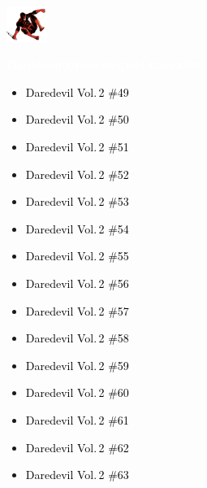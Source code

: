 \documentclass[12pt]{article}
\newcommand{\checkbox}{\raisebox{0.0ex}{\fbox{\rule{0ex}{1.5ex} \rule{1.5ex}{0ex}}}}
\begin{document}
\begin{center}
    \vspace*{2cm}
    \includegraphics[width=0.1\textwidth]{daredevil1.png}
    \vspace{0.3cm}

    {\Huge \textbf{\textcolor{white}{Daredevil Chronological Checklist}}}
\end{center}

\vspace{0.3cm}
\noindent
\begin{tcolorbox}[
  colback=white!95!gray,
  colframe=black,
  width=\textwidth,
  arc=4mm,
  auto outer arc,
  boxrule=0.8pt,
  left=8pt,right=8pt,top=8pt,bottom=8pt
]
\begin{itemize}[left=0pt,label={\checkbox}]
    \item \textcolor{black}{Daredevil Vol.\,2 \#49}
    \item \textcolor{black}{Daredevil Vol.\,2 \#50}
    \item \textcolor{black}{Daredevil Vol.\,2 \#51}
    \item \textcolor{black}{Daredevil Vol.\,2 \#52}
    \item \textcolor{black}{Daredevil Vol.\,2 \#53}
    \item \textcolor{black}{Daredevil Vol.\,2 \#54}
    \item \textcolor{black}{Daredevil Vol.\,2 \#55}
    \item \textcolor{black}{Daredevil Vol.\,2 \#56}
    \item \textcolor{black}{Daredevil Vol.\,2 \#57}
    \item \textcolor{black}{Daredevil Vol.\,2 \#58}
    \item \textcolor{black}{Daredevil Vol.\,2 \#59}
    \item \textcolor{black}{Daredevil Vol.\,2 \#60}
    \item \textcolor{black}{Daredevil Vol.\,2 \#61}
    \item \textcolor{black}{Daredevil Vol.\,2 \#62}
    \item \textcolor{black}{Daredevil Vol.\,2 \#63}
\end{itemize}
\end{tcolorbox}
\end{document}
